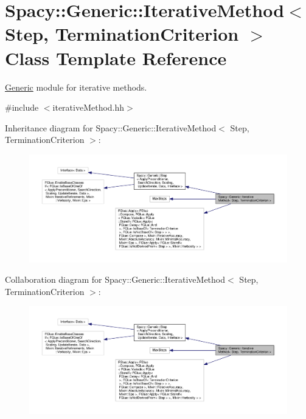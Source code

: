 \hypertarget{classSpacy_1_1Generic_1_1IterativeMethod}{\section{Spacy\-:\-:Generic\-:\-:Iterative\-Method$<$ Step, Termination\-Criterion $>$ Class Template Reference}
\label{classSpacy_1_1Generic_1_1IterativeMethod}
}


\hyperlink{namespaceSpacy_1_1Generic}{Generic} module for iterative methods.  




{\ttfamily \#include $<$iterative\-Method.\-hh$>$}



Inheritance diagram for Spacy\-:\-:Generic\-:\-:Iterative\-Method$<$ Step, Termination\-Criterion $>$\-:
\nopagebreak
\begin{figure}[H]
\begin{center}
\leavevmode
\includegraphics[width=350pt]{classSpacy_1_1Generic_1_1IterativeMethod__inherit__graph}
\end{center}
\end{figure}


Collaboration diagram for Spacy\-:\-:Generic\-:\-:Iterative\-Method$<$ Step, Termination\-Criterion $>$\-:
\nopagebreak
\begin{figure}[H]
\begin{center}
\leavevmode
\includegraphics[width=350pt]{classSpacy_1_1Generic_1_1IterativeMethod__coll__graph}
\end{center}
\end{figure}
